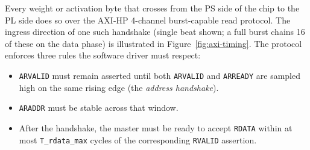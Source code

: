 \documentclass[11pt,a4paper,twoside,openany]{report}
\begin{document}
Every weight or activation byte that crosses from the PS side of the
chip to the PL side does so over the AXI-HP 4-channel burst-capable
read protocol.  The ingress direction of one such handshake (single
beat shown; a full burst chains 16 of these on the data phase) is
illustrated in Figure~\ref{fig:axi-timing}.  The protocol enforces
three rules the software driver must respect:

\begin{itemize}[label={\color{oceanblue}\textbullet}, leftmargin=*, itemsep=0.3ex]
    \item \texttt{ARVALID} must remain asserted until both
          \texttt{ARVALID} and \texttt{ARREADY} are sampled high on
          the same rising edge (the \textit{address handshake}).
    \item \texttt{ARADDR} must be stable across that window.
    \item After the handshake, the master must be ready to accept
          \texttt{RDATA} within at most \texttt{T\_rdata\_max} cycles
          of the corresponding \texttt{RVALID} assertion.
\end{itemize}
\end{document}
